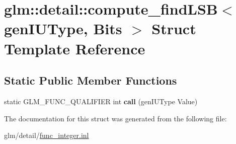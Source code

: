 \hypertarget{structglm_1_1detail_1_1compute__findLSB}{\section{glm\-:\-:detail\-:\-:compute\-\_\-find\-L\-S\-B$<$ gen\-I\-U\-Type, Bits $>$ Struct Template Reference}
\label{structglm_1_1detail_1_1compute__findLSB}
}
\subsection*{Static Public Member Functions}
\begin{DoxyCompactItemize}
\item 
\hypertarget{structglm_1_1detail_1_1compute__findLSB_a1c0ec72e2bcf35a3109e85cfc536400b}{static G\-L\-M\-\_\-\-F\-U\-N\-C\-\_\-\-Q\-U\-A\-L\-I\-F\-I\-E\-R int {\bfseries call} (gen\-I\-U\-Type Value)}\label{structglm_1_1detail_1_1compute__findLSB_a1c0ec72e2bcf35a3109e85cfc536400b}

\end{DoxyCompactItemize}


The documentation for this struct was generated from the following file\-:\begin{DoxyCompactItemize}
\item 
glm/detail/\hyperlink{func__integer_8inl}{func\-\_\-integer.\-inl}\end{DoxyCompactItemize}
